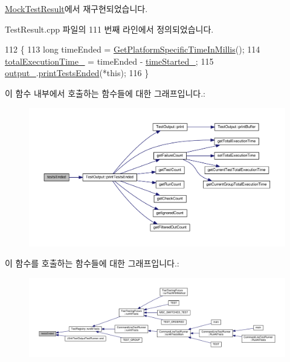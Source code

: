 \hyperlink{class_mock_test_result_ab6f37d2118afa74473737e2dfa384448}{Mock\+Test\+Result}에서 재구현되었습니다.



Test\+Result.\+cpp 파일의 111 번째 라인에서 정의되었습니다.


\begin{DoxyCode}
112 \{
113     \textcolor{keywordtype}{long} timeEnded = \hyperlink{_platform_specific_functions__c_8h_a33cb0a70a9113e80f5334a906151d4dc}{GetPlatformSpecificTimeInMillis}();
114     \hyperlink{class_test_result_ae617e59ed28cde2b6d69c8e0143a839b}{totalExecutionTime\_} = timeEnded - \hyperlink{class_test_result_a388eb648c1723943446ff1de3595b10b}{timeStarted\_};
115     \hyperlink{class_test_result_ac3a8d866a9a5666377f4b37771255ff1}{output\_}.\hyperlink{class_test_output_acc5ba82a215510b66f5f294258686dd4}{printTestsEnded}(*\textcolor{keyword}{this});
116 \}
\end{DoxyCode}


이 함수 내부에서 호출하는 함수들에 대한 그래프입니다.\+:
\nopagebreak
\begin{figure}[H]
\begin{center}
\leavevmode
\includegraphics[width=350pt]{class_test_result_a47626fc9f8f52cc2b188a9f94a72f598_cgraph}
\end{center}
\end{figure}




이 함수를 호출하는 함수들에 대한 그래프입니다.\+:
\nopagebreak
\begin{figure}[H]
\begin{center}
\leavevmode
\includegraphics[width=350pt]{class_test_result_a47626fc9f8f52cc2b188a9f94a72f598_icgraph}
\end{center}
\end{figure}


